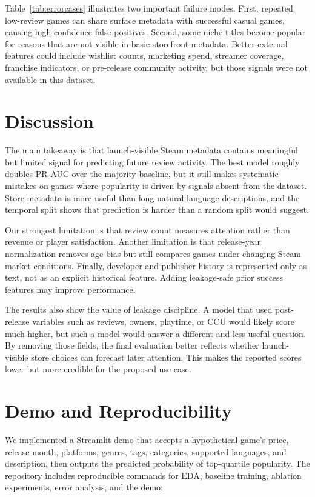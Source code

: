 \documentclass[11pt,sigconf,nonacm]{acmart}
\begin{document}
Table~\ref{tab:errorcases} illustrates two important failure modes. First, repeated low-review games can share surface metadata with successful casual games, causing high-confidence false positives. Second, some niche titles become popular for reasons that are not visible in basic storefront metadata. Better external features could include wishlist counts, marketing spend, streamer coverage, franchise indicators, or pre-release community activity, but those signals were not available in this dataset.

\section{Discussion}

The main takeaway is that launch-visible Steam metadata contains meaningful but limited signal for predicting future review activity. The best model roughly doubles PR-AUC over the majority baseline, but it still makes systematic mistakes on games where popularity is driven by signals absent from the dataset. Store metadata is more useful than long natural-language descriptions, and the temporal split shows that prediction is harder than a random split would suggest.

Our strongest limitation is that review count measures attention rather than revenue or player satisfaction. Another limitation is that release-year normalization removes age bias but still compares games under changing Steam market conditions. Finally, developer and publisher history is represented only as text, not as an explicit historical feature. Adding leakage-safe prior success features may improve performance.

The results also show the value of leakage discipline. A model that used post-release variables such as reviews, owners, playtime, or CCU would likely score much higher, but such a model would answer a different and less useful question. By removing those fields, the final evaluation better reflects whether launch-visible store choices can forecast later attention. This makes the reported scores lower but more credible for the proposed use case.

\section{Demo and Reproducibility}

We implemented a Streamlit demo that accepts a hypothetical game's price, release month, platforms, genres, tags, categories, supported languages, and description, then outputs the predicted probability of top-quartile popularity. The repository includes reproducible commands for EDA, baseline training, ablation experiments, error analysis, and the demo:
\end{document}
